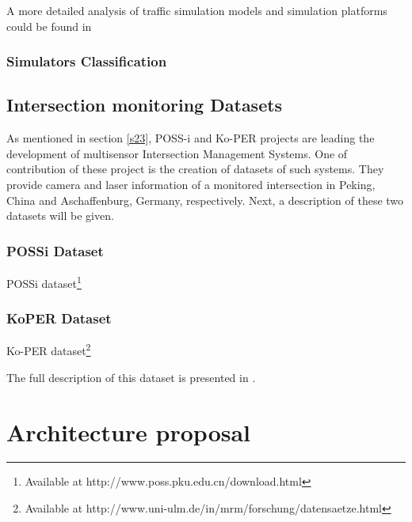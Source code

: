 A more detailed analysis of traffic simulation models and simulation platforms could be found in \cite{AdamsBoxill2000, Barcelo2000, Kitamura2005, Lieberman1992}
\subsubsection{Simulators Classification}
\subsection{Intersection monitoring Datasets}

As mentioned in section \ref{s23}, POSS-i and Ko-PER projects are leading the development of multisensor Intersection Management Systems. One of contribution of these project is the creation of datasets of such systems. They provide camera and laser information of a monitored intersection in Peking, China and Aschaffenburg, Germany, respectively. Next, a description of these two datasets will be given.

\subsubsection{POSSi Dataset }

POSSi dataset\footnote{Available at http://www.poss.pku.edu.cn/download.html}
\subsubsection{KoPER Dataset }

Ko-PER dataset\footnote{Available at http://www.uni-ulm.de/in/mrm/forschung/datensaetze.html}

The full description of this dataset is presented in \cite{Strigel2014}.

\section{Architecture proposal}